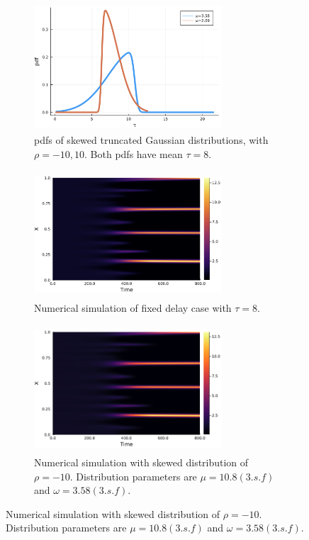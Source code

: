 \begin{figure}[H]
    \centering
    \begin{subfigure}[t]{0.45\textwidth}
        \centering
        \includegraphics[width=7cm,height=4.75cm]{distskew8.png}
        \caption{pdfs of skewed truncated Gaussian distributions, with $\rho=-10,10$. Both pdfs have mean $\tau=8$.}
        \label{}
    \end{subfigure}
    \hfill
    \begin{subfigure}[t]{0.45\textwidth}
        \centering
        \includegraphics[width=7cm,height=4.75cm]{fixt8.png}
        \caption{Numerical simulation of fixed delay case with $\tau=8$.}
        \label{}
    \end{subfigure}
    \hfill
    \begin{subfigure}[t]{0.45\textwidth}
        \centering
        \includegraphics[width=7cm,height=4.75cm]{skewt8m10.png}
        \caption{Numerical simulation with skewed distribution of $\rho=-10$. Distribution parameters are $\mu=10.8(3.s.f)$ and $\omega=3.58(3.s.f)$.}
        \label{}
    \end{subfigure}

\end{figure}
